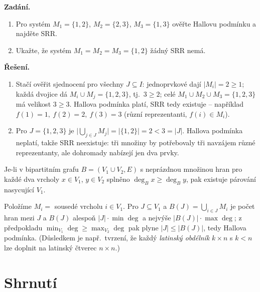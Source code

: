 \documentclass[11pt,a4paper]{article}
\begin{document}
\begin{priklad}
\textbf{Zadání.}
\begin{enumerate}[label=(\arabic*)]
  \item Pro systém $M_1=\{1,2\}$, $M_2=\{2,3\}$, $M_3=\{1,3\}$ ověřte Hallovu podmínku a najděte SRR.
  \item Ukažte, že systém $M_1=M_2=M_3=\{1,2\}$ žádný SRR nemá.
\end{enumerate}

\textbf{Řešení.}
\begin{enumerate}[label=(\arabic*)]
  \item Stačí ověřit sjednocení pro všechny $J\subseteq I$: jednoprvkové dají $|M_i|=2\ge1$; každá dvojice dá $M_i\cup M_j=\{1,2,3\}$, tj.\ $3\ge2$; celé $M_1\cup M_2\cup M_3=\{1,2,3\}$ má velikost $3\ge3$. Hallova podmínka platí, SRR tedy existuje -- například $f(1)=1,\ f(2)=2,\ f(3)=3$ (různí reprezentanti, $f(i)\in M_i$).
  \item Pro $J=\{1,2,3\}$ je $\big|\bigcup_{j\in J}M_j\big|=|\{1,2\}|=2<3=|J|$. Hallova podmínka neplatí, takže SRR neexistuje: tři množiny by potřebovaly tři navzájem různé reprezentanty, ale dohromady nabízejí jen dva prvky.
\end{enumerate}
\end{priklad}

\begin{dusledek}
Je-li v bipartitním grafu $B=(V_1\cup V_2,E)$ s neprázdnou množinou hran pro každé dva vrcholy $x\in V_1$, $y\in V_2$ splněno $\deg_B x\ge\deg_B y$, pak existuje párování nasycující $V_1$.
\end{dusledek}

\begin{intuice}
Položíme $M_i=$ sousedé vrcholu $i\in V_1$. Pro $J\subseteq V_1$ a $B(J)=\bigcup_{i\in J}M_i$ je počet hran mezi $J$ a $B(J)$ alespoň $|J|\cdot\min\deg$ a nejvýše $|B(J)|\cdot\max\deg$; z předpokladu $\min_{V_1}\deg\ge\max_{V_2}\deg$ pak plyne $|J|\le|B(J)|$, tedy Hallova podmínka. (Důsledkem je např.\ tvrzení, že každý \emph{latinský obdélník} $k\times n$ s $k<n$ lze doplnit na latinský čtverec $n\times n$.)
\end{intuice}

\section*{Shrnutí}
\end{document}
